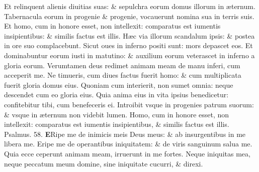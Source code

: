 \documentclass[a5paper,10pt]{book}
\def\ae{æ}
\begin{document}
\begin{multicols*}{2}
\newline \color{red} E\color{black}t relinquent alienis diuitias suas: \& sepulchra eorum domus illorum in \ae ternum.
\newline \color{red} T\color{black}abernacula eorum in progenie \& progenie, vocauerunt nomina sua in terris suis.
\newline \color{red} E\color{black}t homo, cum in honore esset, non intellexit: comparatus est iumentis insipientibus: \& similis factus est illis.
\newline \color{red} H\color{black}\ae c via illorum scandalum ipsis: \& postea in ore suo complacebunt.
\newline \color{red} S\color{black}icut oues in inferno positi sunt: mors depascet eos.
\newline \color{red} E\color{black}t dominabuntur eorum iusti in matutino: \& auxilium eorum veterascet in inferno a gloria eorum.
\newline \color{red} V\color{black}erumtamen deus redimet animam meam de manu inferi, cum acceperit me.
\newline \color{red} N\color{black}e timueris, cum diues factus fuerit homo: \& cum multiplicata fuerit gloria domus eius.
\newline \color{red} Q\color{black}uoniam cum interierit, non sumet omnia: neque descendet cum eo gloria eius.
\newline \color{red} Q\color{black}uia anima eius in vita ipsius benedicetur: confitebitur tibi, cum benefeceris ei.
\newline \color{red} I\color{black}ntroibit vsque in progenies patrum suorum: \& vsque in \ae ternum non videbit lumen.
\newline \color{red} H\color{black}omo, cum in honore esset, non intellexit: comparatus est iumentis insipientibus, \& similis factus est illis.
\newline \color{red} Psalmus. \hypertarget{ps58}{58.} \color{black}
\vspace{-1em}
\lettrine[lines=2]{\bfseries \color{red} E}{}Ripe me de inimicis meis Deus meus: \& ab insurgentibus in me libera me.
\newline \color{red} E\color{black}ripe me de operantibus iniquitatem: \& de viris sanguinum salua me.
\newline \color{red} Q\color{black}uia ecce ceperunt animam meam, irruerunt in me fortes.
\newline \color{red} N\color{black}eque iniquitas mea, neque peccatum meum domine, sine iniquitate cucurri, \& direxi.

\end{multicols*}
\end{document}
